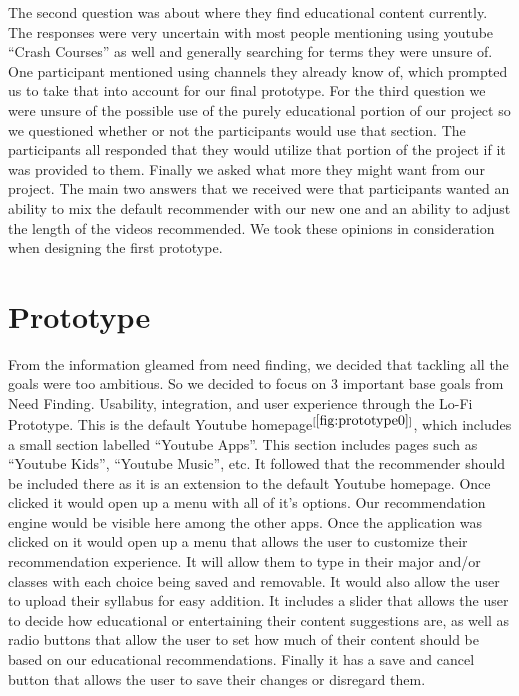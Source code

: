 \documentclass[letterpaper]{article} %
\begin{document}
The second question was about where they find educational content currently. The responses were very uncertain with most people mentioning using youtube “Crash Courses” as well and generally searching for terms they were unsure of. One participant mentioned using channels they already know of, which prompted us to take that into account for our final prototype. For the third question we were unsure of the possible use of the purely educational portion of our project so we questioned whether or not the participants would use that section. The participants all responded that they would utilize that portion of the project if it was provided to them. Finally we asked what more they might want from our project. The main two answers that we received were that participants wanted an ability to mix the default recommender with our new one and an ability to adjust the length of the videos recommended. We took these opinions in consideration when designing the first prototype.

\section{Prototype}

From the information gleamed from need finding, we decided that tackling all the goals were too ambitious. So we decided to focus on 3 important base goals from Need Finding. Usability, integration, and user experience through the Lo-Fi Prototype. This is the default Youtube homepage$^{[\ref{fig:prototype0}]}$, which includes a small section labelled “Youtube Apps”. This section includes pages such as “Youtube Kids”, “Youtube Music”, etc. It followed that the recommender should be included there as it is an extension to the default Youtube homepage. Once clicked it would open up a menu with all of it’s options. Our recommendation engine would be visible here among the other apps. Once the application was clicked on it would open up a menu that allows the user to customize their recommendation experience. It will allow them to type in their major and/or classes with each choice being saved and removable. It would also allow the user to upload their syllabus for easy addition. It includes a slider that allows the user to decide how educational or entertaining their content suggestions are, as well as radio buttons that allow the user to set how much of their content should be based on our educational recommendations. Finally it has a save and cancel button that allows the user to save their changes or disregard them.
\end{document}
